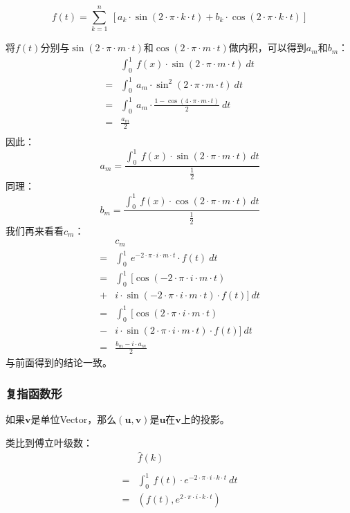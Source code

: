 $$f(t)=\sum\limits_{k=1}^n\ [a_k\cdot \sin(2\cdot\pi\cdot k\cdot t) +b_k\cdot \cos(2\cdot \pi\cdot k\cdot t)]$$

将$f(t)$分别与$\sin(2\cdot \pi\cdot m \cdot t)$和$\cos(2\cdot \pi\cdot m \cdot t)$做内积，可以得到$a_m$和$b_m$：
\begin{align*}
	  & \int_0^1\ f(x)\cdot \sin(2\cdot \pi\cdot m \cdot t)\ dt            \\
	= & \int_0^1\ a_m\cdot \sin^2(2\cdot \pi\cdot m \cdot t)\ dt           \\
	= & \int_0^1\ a_m\cdot \frac{1-\cos(4\cdot \pi\cdot m \cdot t)}{2}\ dt \\
	= & \frac{a_m}{2}                                                      \\
\end{align*}
因此：
$$
	a_m=\frac{\int_0^1\ f(x)\cdot \sin(2\cdot \pi\cdot m \cdot t)\ dt}{\frac{1}{2}}
$$
同理：
$$
	b_m=\frac{\int_0^1\ f(x)\cdot \cos(2\cdot \pi\cdot m \cdot t)\ dt}{\frac{1}{2}}
$$
我们再来看看$c_m$：
\begin{align*}
	  & c_m                                                           \\
	= & \int_0^1 \ e^{-2\cdot \pi\cdot i\cdot m\cdot t}\cdot f(t)\ dt \\
	= & \int_0^1 \ [\cos(-2\cdot \pi\cdot i\cdot m\cdot t)            \\
	+ & i\cdot \sin(-2\cdot \pi\cdot i\cdot m\cdot t)\cdot f(t)]\ dt  \\
	= & \int_0^1 \ [\cos(2\cdot \pi\cdot i\cdot m\cdot t)             \\
	- & i\cdot \sin(2\cdot \pi\cdot i\cdot m\cdot t)\cdot f(t)]\ dt   \\
	= & \frac{b_m-i\cdot a_m}{2}
\end{align*}
与前面得到的结论一致。
\subsubsection{复指函数形}
如果$\mathbf{v}$是单位Vector，那么$(\mathbf{u},\mathbf{v})$是$\mathbf{u}$在$\mathbf{v}$上的投影。

类比到傅立叶级数：
\begin{align*}
	  & \hat{f}(k)                                                    \\                                          \\
	= & \int_0^1 \ f(t)\cdot e^{-2\cdot \pi\cdot i\cdot k\cdot t}\ dt \\
	= & (f(t),e^{2\cdot \pi\cdot i\cdot k\cdot t})
\end{align*}

